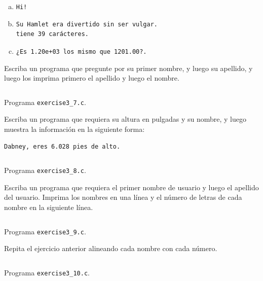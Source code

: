 \documentclass[spanish,addpoints,answers,a4paper]{exam}
\begin{document}
\begin{questions}
\begin{solution}
\begin{enumerate}[a.]
\item \texttt{Hi!}

\item \begin{verbatim}
Su Hamlet era divertido sin ser vulgar.
tiene 39 carácteres.
\end{verbatim}

\item \texttt{¿Es 1.20e+03 los mismo que 1201.00?.}

\end{enumerate}

\end{solution}

\question Escriba un programa que pregunte por su primer nombre, y luego su apellido, y luego los imprima primero el apellido y luego el nombre.

\begin{solution}
\begin{listing}[H]
	\footnotesize
	\inputminted{c}{exercise3_7.c}
	\caption{Programa \texttt{exercise3\_7.c}.}
	\label{lst:3.7}
\end{listing}
\end{solution}

\question Escriba un programa que requiera su altura en pulgadas y su nombre, y luego muestra la información en la siguiente forma:

\begin{verbatim}
Dabney, eres 6.028 pies de alto.
\end{verbatim}

\begin{solution}
\begin{listing}[H]
	\footnotesize
	\inputminted{c}{exercise3_8.c}
	\caption{Programa \texttt{exercise3\_8.c}.}
	\label{lst:3.8}
\end{listing}
\end{solution}

\question Escriba un programa que requiera el primer nombre de usuario y luego el apellido del usuario. Imprima los nombres en una línea y el número de letras de cada nombre en la siguiente línea.

\begin{solution}
\begin{listing}[H]
	\footnotesize
	\inputminted{c}{exercise3_9.c}
	\caption{Programa \texttt{exercise3\_9.c}.}
	\label{lst:3.9}
\end{listing}
\end{solution}

\question Repita el ejercicio anterior alineando cada nombre con cada número.

\begin{solution}
\begin{listing}[H]
	\footnotesize
	\inputminted{c}{exercise3_10.c}
	\caption{Programa \texttt{exercise3\_10.c}.}
	\label{lst:3.10}
\end{listing}	
\end{solution}

\end{questions}
\end{document}
